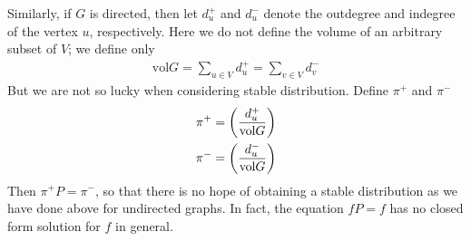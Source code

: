 Similarly, if $G$ is directed, then let $d^+_u$ and $d^-_u$ denote the outdegree and
indegree of the vertex $u$, respectively. Here we do not define the volume of an
arbitrary subset of $V$; we define only
\begin{eqnarray*}
\text{vol}G=\sum_{u\in V}d^+_u=\sum_{v\in V}d^-_v
\end{eqnarray*}
But we are not so lucky when considering stable distribution. Define $\pi^+$ and
$\pi^-$
\begin{eqnarray*}
\pi^+=\left({d^+_u\over\text{vol}G}\right)\\
\pi^-=\left({d^-_u\over\text{vol}G}\right)
\end{eqnarray*}
Then $\pi^+P=\pi^-$, so that there is no hope of obtaining a stable distribution as
we have done above for undirected graphs. In fact, the equation $fP=f$ has no closed
form solution for $f$ in general.
